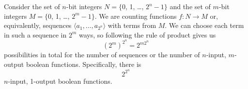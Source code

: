 Consider the set of $n$-bit integers $N=\{0$, 1, \dots, $2^n-1\}$ and the set of $m$-bit integers $M=\{0$, 1, \dots, $2^m-1\}$.
We are counting functions $f:N\to M$ or, equivalently, sequences $\langle a_1,\dots,a_{2^n}\!\rangle$ with terms from $M$.
We can choose each term in such a sequence in $2^m$ ways, so following the rule of product gives us
\[
    (2^m)^{2^n}=2^{m2^n}
\]
possibilities in total for the number of sequences or the number of $n$-input, $m$-output boolean functions.
Specifically, there is
\[
    2^{2^n}
\]
$n$-input, 1-output boolean functions.
